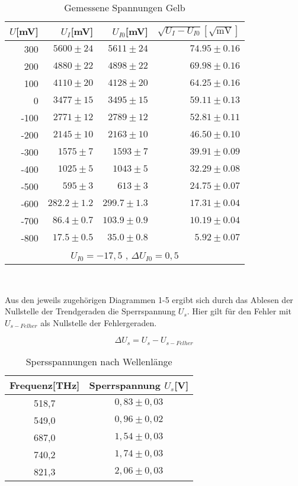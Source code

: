 \begin{table}[ht]
  \centering
  \caption{Gemessene Spannungen Gelb}
   \begin{tabular}{r | r | r | r}
    \toprule
    $U$[mV] & $U_I$[mV] & $U_{I0}$[mV] & $\sqrt{U_I  - U_{I0}}[\sqrt{\text{mV}}]$\\
    \midrule
    300   & $5600 \pm 24$ & $5611  \pm24$ & $74.95 \pm 0.16$ \\
    200   &$ 4880 \pm 22 $&$ 4898\pm 22$ & $69.98 \pm 0.16$ \\
    100   & $4110 \pm 20$ & $4128 \pm 20$& $64.25 \pm 0.16$\\
    0     & $3477 \pm 15$ & $3495 \pm 15$ & $59.11 \pm 0.13$ \\
    -100  & $2771 \pm 12 $& $2789 \pm 12$ & $52.81 \pm 0.11$ \\
    -200  & $2145 \pm 10$ &$ 2163 \pm 10$ & $46.50 \pm0.10 $\\
    -300  & $1575 \pm 7$& $1593\pm 7 $& $39.91 \pm 0.09$\\
    -400  & $1025 \pm 5$ & $1043 \pm 5 $& $32.29 \pm 0.08$ \\
    -500  & $595 \pm 3$ & $613 \pm 3$ & $24.75 \pm 0.07 $\\
    -600  & $282.2 \pm 1.2$ & $299.7 \pm 1.3$ &$ 17.31 \pm 0.04$ \\
    -700  & $86.4 \pm 0.7$ & $103.9 \pm 0.9$ & $10.19 \pm 0.04$ \\
    -800  & $17.5  \pm 0.5$ & $35.0  \pm 0.8 $& $5.92 \pm 0.07$ \\
    \bottomrule
    \multicolumn{4}{c}{$U_{I0} = -17,5$ , $\Delta U_{I0} = 0,5$}
    \end{tabular}
\end{table}%
\clearpage
\newpage
\mbox{~}
\clearpage
\newpage


Aus den jeweils zugehörigen Diagrammen 1-5 ergibt sich durch das Ablesen der Nullstelle
der Trendgeraden die Sperrspannung $U_s$. Hier gilt für den Fehler mit  $U_{s-Felher}$ als
Nullstelle der Fehlergeraden. 

\begin{equation}
    \Delta U_s = U_s - U_{s-Felher}
\end{equation}

\begin{table}[h]
    \centering
    \caption{Spersspannungen nach Wellenlänge}
    \begin{tabular}{c | c }
        \toprule
        Frequenz[THz] & Sperrspannung $U_s$[V]\\
        \midrule
        518,7 & $0,83 \pm 0,03$ \\
        549,0 & $0,96 \pm 0,02$ \\
        687,0 & $1,54 \pm 0,03$ \\
        740,2 & $1,74 \pm 0,03$ \\
        821,3 & $ 2,06 \pm 0,03$ \\
        \bottomrule
    \end{tabular}
\end{table}



